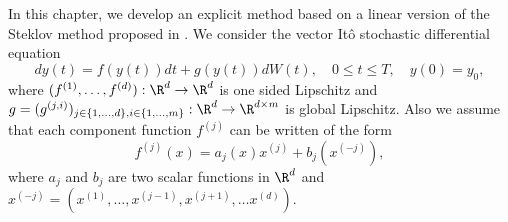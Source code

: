 
	In this chapter, we develop an explicit method based on a linear version  of the Steklov method proposed 
in  . We consider the vector It\^o stochastic differential equation
\begin{equation}\label{eqn:SDE1}
	dy(t)
	 =f(y(t))dt + g(y(t))dW(t), \quad 0\leq t\leq T,
	\quad y(0)=y_0,
\end{equation}
where $(f^{(1)},\dots, f^{(d)}):\R^d \to \R^d$ is one sided Lipschitz and 
$g = (g^{(j,i)})_{j\in \{1,\dots,d\}, i\in\{1,\dots, m\}}:\R^d \to \R^{d\times m}$ is global Lipschitz. 
Also we assume 
that  each component function $f^{(j)}$  can be written of the form
\begin{equation}\label{eqn:AlternativeConstruction}
	f^{(j)}(x) = a_j(x) x^{(j)} + b_j (x^{(-j)}), 
\end{equation}
where $a_j$ and	$b_{j}$ are two scalar 	functions in  $\R^d$ 
and $x^{(-j)} = \left( x^{(1)},\dots,x^{(j-1)},x^{(j+1)},\dots x^{(d)}\right)$.%
